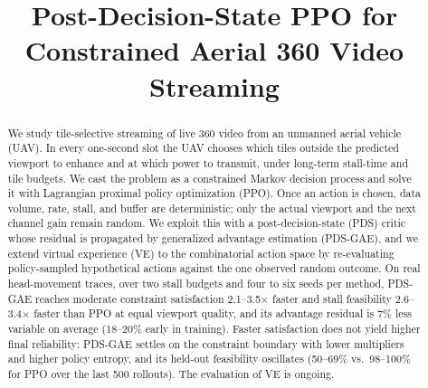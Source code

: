\documentclass[conference]{IEEEtran}
\begin{document}
\title{Post-Decision-State PPO for Constrained Aerial 360\textdegree{} Video Streaming
}

\author{
}

\maketitle

\begin{abstract}
We study tile-selective streaming of live 360\textdegree{} video from an unmanned aerial vehicle (UAV). In every one-second slot the UAV chooses which tiles outside the predicted viewport to enhance and at which power to transmit, under long-term stall-time and tile budgets. We cast the problem as a constrained Markov decision process and solve it with Lagrangian proximal policy optimization (PPO). Once an action is chosen, data volume, rate, stall, and buffer are deterministic; only the actual viewport and the next channel gain remain random. We exploit this with a post-decision-state (PDS) critic whose residual is propagated by generalized advantage estimation (PDS-GAE), and we extend virtual experience (VE) to the combinatorial action space by re-evaluating policy-sampled hypothetical actions against the one observed random outcome. On real head-movement traces, over two stall budgets and four to six seeds per method, PDS-GAE reaches moderate constraint satisfaction 2.1--3.5$\times$ faster and stall feasibility 2.6--3.4$\times$ faster than PPO at equal viewport quality, and its advantage residual is 7\% less variable on average (18--20\% early in training). Faster satisfaction does not yield higher final reliability: PDS-GAE settles on the constraint boundary with lower multipliers and higher policy entropy, and its held-out feasibility oscillates (50--69\% vs.\ 98--100\% for PPO over the last 500 rollouts). The evaluation of VE is ongoing.
\end{abstract}
\end{document}
